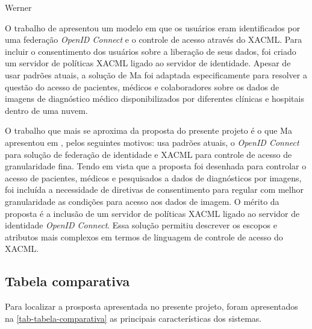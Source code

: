 \documentclass{doublecol-new}
\begin{document}
Werner 

O trabalho de \cite{ma2015cloud} apresentou um modelo em que os usuários eram identificados por uma federação \textit{OpenID Connect} e o controle de acesso através do XACML. Para incluir o consentimento dos usuários sobre a liberação de seus dados, foi criado um servidor de políticas XACML ligado ao servidor de identidade. Apesar de usar padrões atuais, a solução de Ma foi adaptada especificamente para resolver a questão do acesso de pacientes, médicos e colaboradores sobre os dados de imagens de diagnóstico médico disponibilizados por diferentes clínicas e hospitais dentro de uma nuvem.

O trabalho que mais se aproxima da proposta do presente projeto é o que Ma apresentou em \cite{ma2015cloud}, pelos seguintes motivos: usa padrões atuais, o \textit{OpenID Connect} para solução de federação de identidade e XACML para controle de acesso de granularidade fina. Tendo em vista que a proposta foi desenhada para controlar o acesso de pacientes, médicos e pesquisados a dados de diagnósticos por imagens, foi incluída a necessidade de diretivas de consentimento para regular com melhor granularidade as condições para acesso aos dados de imagem. O mérito da proposta é a inclusão de um servidor de políticas XACML ligado ao servidor de identidade \textit{OpenID Connect}. Essa solução permitiu descrever os escopos e atributos mais complexos em termos de linguagem de controle de acesso do XACML.






\subsection{Tabela comparativa}

Para localizar a prosposta apresentada no presente projeto, foram apresentados na \ref{tab-tabela-comparativa} as principais características dos sistemas.
\end{document}
